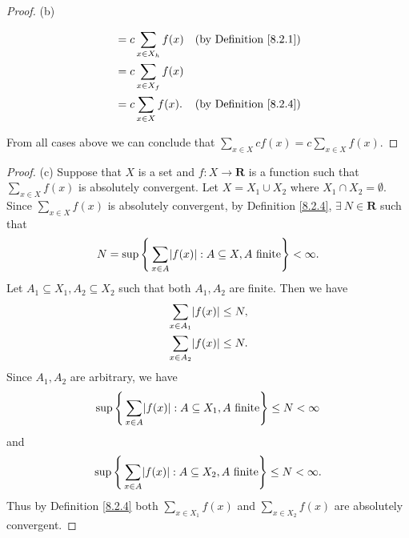 \begin{proof}{(b)}
\begin{enumerate}[label=(\Roman*)]
\begin{align*}
                                       & = c \sum_{x \in X_h} f(x)         & \text{(by Definition \ref{8.2.1})}      \\
                                       & = c \sum_{x \in X_f} f(x)                                                   \\
                                       & = c \sum_{x \in X} f(x).          & \text{(by Definition \ref{8.2.4})}
              \end{align*}
    \end{enumerate}
    From all cases above we can conclude that \(\sum_{x \in X} cf(x) = c \sum_{x \in X} f(x)\).
\end{proof}

\begin{proof}{(c)}
    Suppose that \(X\) is a set and \(f : X \to \mathbf{R}\) is a function such that \(\sum_{x \in X} f(x)\) is absolutely convergent.
    Let \(X = X_1 \cup X_2\) where \(X_1 \cap X_2 = \emptyset\).
    Since \(\sum_{x \in X} f(x)\) is absolutely convergent, by Definition \ref{8.2.4}, \(\exists\ N \in \mathbf{R}\) such that
    \[
        N = \sup\Bigg\{\sum_{x \in A} \abs*{f(x)} : A \subseteq X, A \text{ finite}\Bigg\} < \infty.
    \]
    Let \(A_1 \subseteq X_1, A_2 \subseteq X_2\) such that both \(A_1, A_2\) are finite.
    Then we have
    \begin{align*}
         & \sum_{x \in A_1} \abs*{f(x)} \leq N, \\
         & \sum_{x \in A_2} \abs*{f(x)} \leq N.
    \end{align*}
    Since \(A_1, A_2\) are arbitrary, we have
    \[
        \sup\Bigg\{\sum_{x \in A} \abs*{f(x)} : A \subseteq X_1, A \text{ finite}\Bigg\} \leq N < \infty
    \]
    and
    \[
        \sup\Bigg\{\sum_{x \in A} \abs*{f(x)} : A \subseteq X_2, A \text{ finite}\Bigg\} \leq N < \infty.
    \]
    Thus by Definition \ref{8.2.4} both \(\sum_{x \in X_1} f(x)\) and \(\sum_{x \in X_2} f(x)\) are absolutely convergent.


\end{proof}
